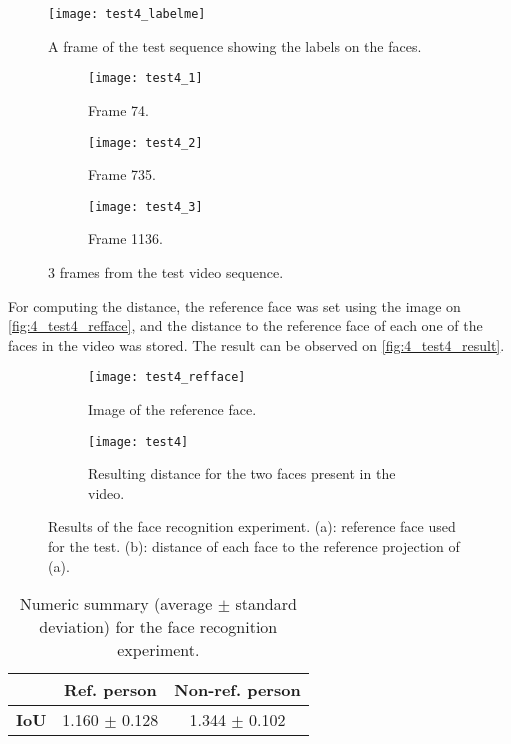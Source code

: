 \begin{figure}[h]
	\centering
	\texttt{[image: test4\_labelme]}
	\caption{A frame of the test sequence showing the labels on the faces.}
	\label{fig:4_test4_labelme}
\end{figure}



\begin{figure}[h]
	\centering
	\begin{subfigure}[b]{0.3\linewidth}
		\centering
		\texttt{[image: test4\_1]}
		\caption{Frame 74.}
	\end{subfigure}
	\begin{subfigure}[b]{0.3\linewidth}
		\centering
		\texttt{[image: test4\_2]}
		\caption{Frame 735.}
	\end{subfigure}
	\begin{subfigure}[b]{0.3\linewidth}
		\centering
		\texttt{[image: test4\_3]}
		\caption{Frame 1136.}
	\end{subfigure}
	\caption{3 frames from the test video sequence.}
	\label{fig:4_test4_frames}
\end{figure}


For computing the distance, the reference face was set using the image on \autoref{fig:4_test4_refface}, and the distance to the reference face of each one of the faces in the video was stored. The result can be observed on \autoref{fig:4_test4_result}.


\begin{figure}[h]
	\centering
	\begin{subfigure}[b]{0.25\linewidth}
		\centering
		\texttt{[image: test4\_refface]}
		\caption{Image of the reference face.}
		\label{fig:4_test4_refface}
	\end{subfigure}
	\hfill
	\begin{subfigure}[b]{0.7\linewidth}
		\centering
		\texttt{[image: test4]}
		\caption{Resulting distance for the two faces present in the video.}
		\label{fig:4_test4_result}
	\end{subfigure}
	\caption{Results of the face recognition experiment. (a): reference face used for the test. (b): distance of each face to the reference projection of (a).}
	\label{fig:4_test4}
\end{figure}


\begin{table}[h]
	\begin{tabular}{|l|c|c|}
		\hline
		& \textbf{Ref. person} & \textbf{Non-ref. person} \\ \hline
		\textbf{IoU}           & 1.160 $\pm$  0.128 & 1.344 $\pm$  0.102 \\ \hline
	\end{tabular}
	\caption{Numeric summary (average $\pm$ standard deviation) for the face recognition experiment.}
	\label{tab:4_test4}
\end{table}


